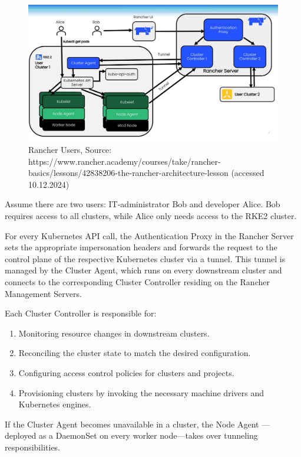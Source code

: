 \documentclass[../main.tex]{subfiles}
\begin{document}
\begin{figure}[H]
    \centering
    \includegraphics[scale=0.3]{img/3-background/rancher/rancher_users.png}
    \caption{Rancher Users, Source: https://www.rancher.academy/courses/take/rancher-basics/lessons/42838206-the-rancher-architecture-lesson (accessed 10.12.2024)}
    \label{fig:rancher_users}
\end{figure}

Assume there are two users: IT-administrator Bob and developer Alice. Bob requires access to all clusters, while Alice only needs access to the RKE2 cluster.

For every Kubernetes API call, the Authentication Proxy in the Rancher Server sets the appropriate impersonation headers and forwards the request to the control plane of the respective Kubernetes cluster via a tunnel. This tunnel is managed by the Cluster Agent, which runs on every downstream cluster and connects to the corresponding Cluster Controller residing on the Rancher Management Servers. 

Each Cluster Controller is responsible for:

\begin{enumerate}
    \item Monitoring resource changes in downstream clusters.
    \item Reconciling the cluster state to match the desired configuration.
    \item Configuring access control policies for clusters and projects.
    \item Provisioning clusters by invoking the necessary machine drivers and Kubernetes engines.
\end{enumerate}

If the Cluster Agent becomes unavailable in a cluster, the Node Agent — deployed as a DaemonSet on every worker node—takes over tunneling responsibilities.  
\end{document}
